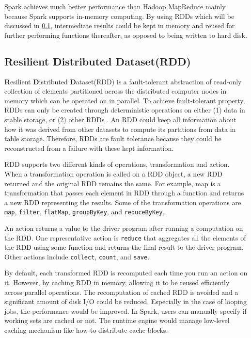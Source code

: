 Spark achieves much better performance than Hadoop MapReduce mainly because Spark supports in-memory computing. By using RDDs which will be discussed in \cref{subsection:rdd}, intermediate results could be kept in memory and reused for further performing functions thereafter, as opposed to being written to hard disk. 

\subsection{ Resilient Distributed Dataset(RDD)}
\label{subsection:rdd}
\textbf{R}esilient \textbf{D}istributed \textbf{D}ataset(RDD) is a fault-tolerant abstraction of read-only collection of elements partitioned across the distributed computer nodes in memory which can be operated on in parallel. To achieve fault-tolerant property, RDDs can only be created through deterministic operations on either (1) data in stable storage, or (2) other RDDs \cite{zaharia2012resilient}. An RDD could keep all information about how it was derived from other datasets to compute its partitions from data in table storage. Therefore, RDDs are fault tolerance because they could be reconstructed from a failure with these kept information. 

RDD supports two different kinds of operations, transformation and action. When a transformation operation is called on a RDD object, a new RDD returned and the original RDD remains the same. For example, map is a transformation that passes each element in RDD through a function and returns a new RDD representing the results. Some of the transformation operations are \texttt{map}, \texttt{filter}, \texttt{flatMap}, \texttt{groupByKey}, and \texttt{reduceByKey}. 

An action returns a value to the driver program after running a computation on the RDD. One representative action is \texttt{reduce} that aggregates all the elements of the RDD using some function and returns the final result to the driver program. Other actions include \texttt{collect}, \texttt{count}, and \texttt{save}.

By default, each transformed RDD is recomputed each time you run an action on it. However, by caching RDD in memory, allowing it to be reused efficiently across parallel operations. The recomputation of cached RDD is avoided and a significant amount of disk I/O could be reduced. Especially in the case of looping jobs, the performance would be improved. In Spark, users can manually specify if working sets are cached or not. The runtime engine would manage low-level caching mechanism like how to distribute cache blocks.

